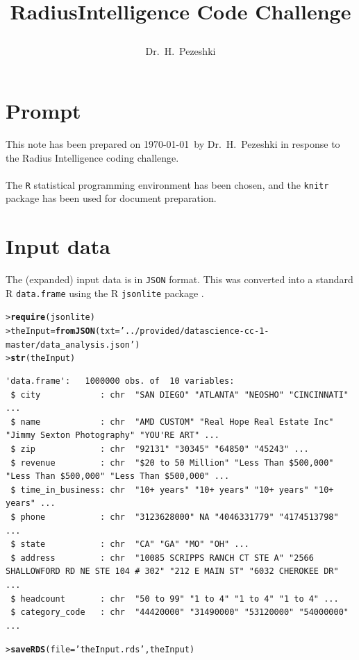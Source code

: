 \documentclass[12pt]{article}\usepackage[]{graphicx}\usepackage[]{color}
\makeatletter
\newcommand{\hlstr}[1]{\textcolor[rgb]{0.192,0.494,0.8}{#1}}%
\newcommand{\hlstd}[1]{\textcolor[rgb]{0.345,0.345,0.345}{#1}}%
\newcommand{\hlkwb}[1]{\textcolor[rgb]{0.69,0.353,0.396}{#1}}%
\newcommand{\hlkwc}[1]{\textcolor[rgb]{0.333,0.667,0.333}{#1}}%
\newcommand{\hlkwd}[1]{\textcolor[rgb]{0.737,0.353,0.396}{\textbf{#1}}}%
\newenvironment{kframe}{%
 \def\at@end@of@kframe{}%
 \ifinner\ifhmode%
  \def\at@end@of@kframe{\end{minipage}}%
  \begin{minipage}{\columnwidth}%
 \fi\fi%
 \def\FrameCommand##1{\hskip\@totalleftmargin \hskip-\fboxsep
 \colorbox{shadecolor}{##1}\hskip-\fboxsep
     \hskip-\linewidth \hskip-\@totalleftmargin \hskip\columnwidth}%
 \MakeFramed {\advance\hsize-\width
   \@totalleftmargin\z@ \linewidth\hsize
   \@setminipage}}%
 {\par\unskip\endMakeFramed%
 \at@end@of@kframe}
\newenvironment{knitrout}{}{} %
\makeatother
\begin{document}
\title{
RadiusIntelligence Code Challenge\\
\author{
{Dr.~H.~Pezeshki}
}}

\maketitle
\tableofcontents
\newpage





\section{Prompt}
This note has been prepared on \today\ by Dr.\ H.\ Pezeshki in response to the Radius Intelligence
coding challenge.\\~\\
The \texttt{R} statistical programming environment \cite{ritself} has been chosen, and the \texttt{knitr} package
\cite{knitr} has been used for document preparation.

\section{Input data}
The (expanded) input data is in \texttt{JSON} format. This was converted into a standard R \texttt{data.frame}
using the R \texttt{jsonlite} package \cite{jsonlite}. 
\begin{knitrout}\footnotesize
{}\color{fgcolor}\begin{kframe}
\begin{alltt}
\hlstd{> }\hlkwd{require} \hlstd{(jsonlite)}
\hlstd{> }\hlstd{theInput} \hlkwb{=} \hlkwd{fromJSON} \hlstd{(}\hlkwc{txt} \hlstd{=} \hlstr{'../provided/datascience-cc-1-master/data_analysis.json'}\hlstd{)}
\hlstd{> }\hlkwd{str} \hlstd{(theInput)}
\end{alltt}
\begin{verbatim}
'data.frame':	1000000 obs. of  10 variables:
 $ city            : chr  "SAN DIEGO" "ATLANTA" "NEOSHO" "CINCINNATI" ...
 $ name            : chr  "AMD CUSTOM" "Real Hope Real Estate Inc" "Jimmy Sexton Photography" "YOU'RE ART" ...
 $ zip             : chr  "92131" "30345" "64850" "45243" ...
 $ revenue         : chr  "$20 to 50 Million" "Less Than $500,000" "Less Than $500,000" "Less Than $500,000" ...
 $ time_in_business: chr  "10+ years" "10+ years" "10+ years" "10+ years" ...
 $ phone           : chr  "3123628000" NA "4046331779" "4174513798" ...
 $ state           : chr  "CA" "GA" "MO" "OH" ...
 $ address         : chr  "10085 SCRIPPS RANCH CT STE A" "2566 SHALLOWFORD RD NE STE 104 # 302" "212 E MAIN ST" "6032 CHEROKEE DR" ...
 $ headcount       : chr  "50 to 99" "1 to 4" "1 to 4" "1 to 4" ...
 $ category_code   : chr  "44420000" "31490000" "53120000" "54000000" ...
\end{verbatim}
\begin{alltt}
\hlstd{> }\hlkwd{saveRDS} \hlstd{(}\hlkwc{file}\hlstd{=}\hlstr{'theInput.rds'}\hlstd{, theInput)}
\end{alltt}
\end{kframe}
\end{knitrout}
\end{document}
